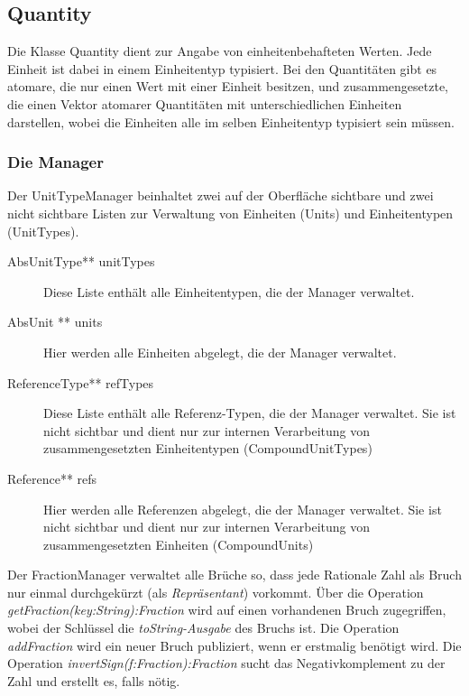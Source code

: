 \subsection{Quantity}
Die Klasse Quantity dient zur Angabe von einheitenbehafteten Werten. Jede Einheit ist dabei in einem Einheitentyp typisiert. Bei den Quantitäten gibt es atomare, die nur einen Wert mit einer Einheit besitzen, und zusammengesetzte, die einen Vektor atomarer Quantitäten mit unterschiedlichen Einheiten darstellen, wobei die Einheiten alle im selben Einheitentyp typisiert sein müssen.

\subsubsection{Die Manager}


Der UnitTypeManager beinhaltet zwei auf der Oberfläche sichtbare und zwei nicht sichtbare Listen zur Verwaltung von Einheiten (Units) und Einheitentypen (UnitTypes).

\begin{description}
\item[AbsUnitType** unitTypes] Diese Liste enthält alle Einheitentypen, die der Manager verwaltet.
\item[AbsUnit ** units] Hier werden alle Einheiten abgelegt, die der Manager verwaltet.
\item[ReferenceType** refTypes] Diese Liste enthält alle Referenz-Typen, die der Manager verwaltet. Sie ist nicht sichtbar und dient nur zur internen Verarbeitung von zusammengesetzten Einheitentypen (CompoundUnitTypes)
\item[Reference** refs] Hier werden alle Referenzen abgelegt, die der Manager verwaltet. Sie ist nicht sichtbar und dient nur zur internen Verarbeitung von zusammengesetzten Einheiten (CompoundUnits)
\end{description}

\label{FractionManager}

Der FractionManager verwaltet alle Brüche so, dass jede Rationale Zahl als Bruch nur einmal durchgekürzt (als \emph{Repräsentant}) vorkommt.
Über die Operation \textit{getFraction(key:String):Fraction} wird auf einen vorhandenen Bruch zugegriffen, wobei der Schlüssel die \textit{toString-Ausgabe} des Bruchs ist.
Die Operation \textit{addFraction} wird ein neuer Bruch publiziert, wenn er erstmalig benötigt wird. Die Operation \textit{invertSign(f:Fraction):Fraction} sucht das Negativkomplement zu der Zahl und erstellt es, falls nötig.

